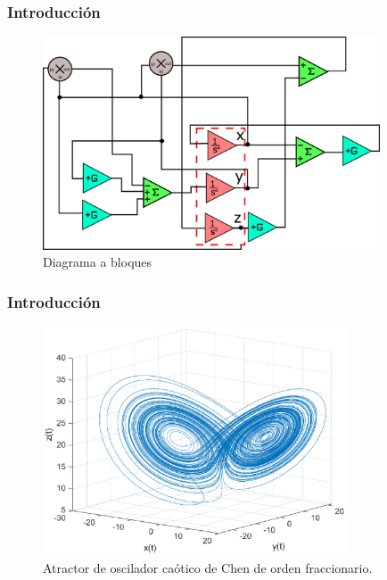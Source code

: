 \documentclass[10pt]{beamer}
\begin{document}
	
	\begin{frame}
		\frametitle{Introducción}
		\begin{figure}[hbtp]
			\centering
			\includegraphics[width = 10cm]{Chen_esquematico.eps}
			\caption{Diagrama a bloques}
		\end{figure}
	\end{frame}
	
	
	\begin{frame}
		\frametitle{Introducción}
		\begin{figure}[hbtp]
			\centering
			\includegraphics[width = 9cm]{A1_oscilador_de_chen.eps}
			\caption{Atractor de oscilador caótico de Chen de orden fraccionario.}
		\end{figure}
	\end{frame}
	
\end{document}
